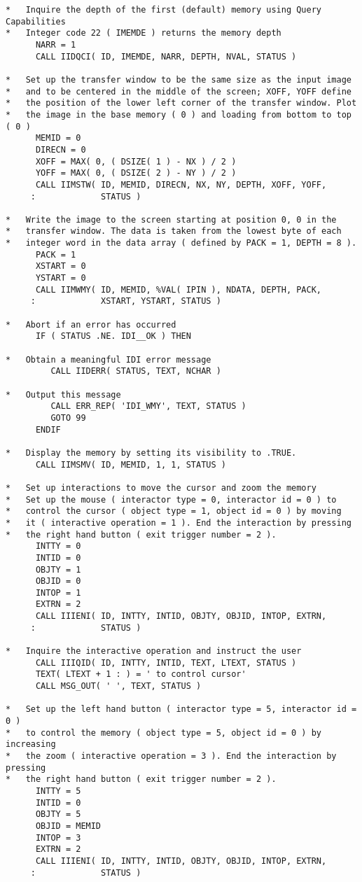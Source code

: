 \begin{small}
\begin{verbatim}
*   Inquire the depth of the first (default) memory using Query Capabilities
*   Integer code 22 ( IMEMDE ) returns the memory depth
      NARR = 1
      CALL IIDQCI( ID, IMEMDE, NARR, DEPTH, NVAL, STATUS )

*   Set up the transfer window to be the same size as the input image
*   and to be centered in the middle of the screen; XOFF, YOFF define
*   the position of the lower left corner of the transfer window. Plot
*   the image in the base memory ( 0 ) and loading from bottom to top ( 0 )
      MEMID = 0
      DIRECN = 0
      XOFF = MAX( 0, ( DSIZE( 1 ) - NX ) / 2 )
      YOFF = MAX( 0, ( DSIZE( 2 ) - NY ) / 2 )
      CALL IIMSTW( ID, MEMID, DIRECN, NX, NY, DEPTH, XOFF, YOFF,
     :             STATUS )

*   Write the image to the screen starting at position 0, 0 in the
*   transfer window. The data is taken from the lowest byte of each
*   integer word in the data array ( defined by PACK = 1, DEPTH = 8 ).
      PACK = 1
      XSTART = 0
      YSTART = 0
      CALL IIMWMY( ID, MEMID, %VAL( IPIN ), NDATA, DEPTH, PACK,
     :             XSTART, YSTART, STATUS )

*   Abort if an error has occurred
      IF ( STATUS .NE. IDI__OK ) THEN

*   Obtain a meaningful IDI error message
         CALL IIDERR( STATUS, TEXT, NCHAR )

*   Output this message
         CALL ERR_REP( 'IDI_WMY', TEXT, STATUS )
         GOTO 99
      ENDIF

*   Display the memory by setting its visibility to .TRUE.
      CALL IIMSMV( ID, MEMID, 1, 1, STATUS )

*   Set up interactions to move the cursor and zoom the memory
*   Set up the mouse ( interactor type = 0, interactor id = 0 ) to
*   control the cursor ( object type = 1, object id = 0 ) by moving
*   it ( interactive operation = 1 ). End the interaction by pressing
*   the right hand button ( exit trigger number = 2 ).
      INTTY = 0
      INTID = 0
      OBJTY = 1
      OBJID = 0
      INTOP = 1
      EXTRN = 2
      CALL IIIENI( ID, INTTY, INTID, OBJTY, OBJID, INTOP, EXTRN,
     :             STATUS )

*   Inquire the interactive operation and instruct the user
      CALL IIIQID( ID, INTTY, INTID, TEXT, LTEXT, STATUS )
      TEXT( LTEXT + 1 : ) = ' to control cursor'
      CALL MSG_OUT( ' ', TEXT, STATUS )

*   Set up the left hand button ( interactor type = 5, interactor id = 0 )
*   to control the memory ( object type = 5, object id = 0 ) by increasing
*   the zoom ( interactive operation = 3 ). End the interaction by pressing
*   the right hand button ( exit trigger number = 2 ).
      INTTY = 5
      INTID = 0
      OBJTY = 5
      OBJID = MEMID
      INTOP = 3
      EXTRN = 2
      CALL IIIENI( ID, INTTY, INTID, OBJTY, OBJID, INTOP, EXTRN,
     :             STATUS )


\end{verbatim}
\end{small}
